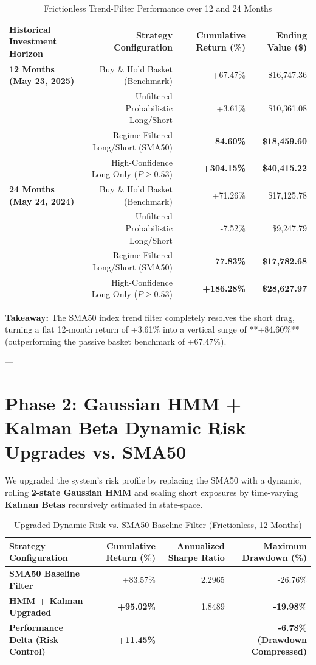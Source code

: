 \documentclass[11pt,article]{article}
\begin{document}
\begin{table}[h!]
\centering
\caption{Frictionless Trend-Filter Performance over 12 and 24 Months}
\begin{tabular}{lrrr}
\toprule
\textbf{Historical Investment Horizon} & \textbf{Strategy Configuration} & \textbf{Cumulative Return (\%)} & \textbf{Ending Value (\$)} \\
\midrule
\textbf{12 Months (May 23, 2025)} & Buy \& Hold Basket (Benchmark) & +67.47\% & \$16,747.36 \\
 & Unfiltered Probabilistic Long/Short & +3.61\% & \$10,361.08 \\
 & Regime-Filtered Long/Short (SMA50) & \textbf{+84.60\%} & \textbf{\$18,459.60} \\
 & High-Confidence Long-Only ($P \geq 0.53$) & \textbf{+304.15\%} & \textbf{\$40,415.22} \\
\midrule
\textbf{24 Months (May 24, 2024)} & Buy \& Hold Basket (Benchmark) & +71.26\% & \$17,125.78 \\
 & Unfiltered Probabilistic Long/Short & -7.52\% & \$9,247.79 \\
 & Regime-Filtered Long/Short (SMA50) & \textbf{+77.83\%} & \textbf{\$17,782.68} \\
 & High-Confidence Long-Only ($P \geq 0.53$) & \textbf{+186.28\%} & \textbf{\$28,627.97} \\
\bottomrule
\end{tabular}
\end{table}

\textbf{Takeaway:} The SMA50 index trend filter completely resolves the short drag, turning a flat 12-month return of +3.61\% into a vertical surge of **+84.60\%** (outperforming the passive basket benchmark of +67.47\%).

---

\section{Phase 2: Gaussian HMM + Kalman Beta Dynamic Risk Upgrades vs. SMA50}
We upgraded the system's risk profile by replacing the SMA50 with a dynamic, rolling \textbf{2-state Gaussian HMM} and scaling short exposures by time-varying \textbf{Kalman Betas} recursively estimated in state-space.

\begin{table}[h!]
\centering
\caption{Upgraded Dynamic Risk vs. SMA50 Baseline Filter (Frictionless, 12 Months)}
\begin{tabular}{lrrr}
\toprule
\textbf{Strategy Configuration} & \textbf{Cumulative Return (\%)} & \textbf{Annualized Sharpe Ratio} & \textbf{Maximum Drawdown (\%)} \\
\midrule
\textbf{SMA50 Baseline Filter} & +83.57\% & 2.2965 & -26.76\% \\
\textbf{HMM + Kalman Upgraded} & \textbf{+95.02\%} & 1.8489 & \textbf{-19.98\%} \\
\midrule
\textbf{Performance Delta (Risk Control)} & \textbf{+11.45\%} & — & \textbf{-6.78\% (Drawdown Compressed)} \\
\bottomrule
\end{tabular}
\end{table}
\end{document}
